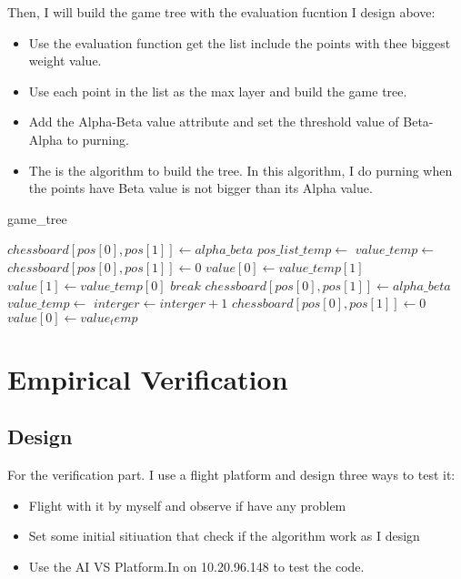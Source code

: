 \documentclass[conference,compsoc]{IEEEtran}
\begin{document}
  Then, I will build the game tree with the evaluation fucntion I design above:
  \begin{itemize}
    \item Use the evaluation function get the list include the points with thee biggest weight value.
    \item Use each point in the list as the max layer and build the game tree.
    \item Add the Alpha-Beta value attribute and set the threshold value of Beta-Alpha to purning.
    \item The  is the algorithm to build the tree. In this algorithm, I do purning when the points have Beta value is not bigger than its Alpha value.
  \end{itemize}
  \begin{algorithm}
    \caption{game\_tree}
    \begin{algorithmic}[1]
      \State $ chessboard[pos[0],pos[1]] \gets alpha\_beta $
      \State $ pos\_list\_temp \gets$
      \State $ value\_temp\gets$
      \State $ chessboard[pos[0], pos[1]]\gets 0 $
              \State $ value[0]\gets value\_temp[1]$
              \EndIf
          \Else
              \State $ value[1]\gets value\_temp[0]$
              \EndIf
              \EndIf    
          \State $ break $
          \EndIf    
      \Else
      \State $ chessboard[pos[0], pos[1]]\gets alpha\_beta $
      \State $ value\_temp \gets$
      \State $ interger\gets interger + 1 $
      \State $ chessboard[pos[0], pos[1]]\gets 0 $
      \State $ value[0]\gets value_temp $
      \EndIf
    \EndFor
        \EndFunction
      \end{algorithmic}
  \end{algorithm}

\section{Empirical Verification}
\subsection{Design}
For the verification part. I use a flight platform and design three ways to test it:
\begin{itemize}
  \item Flight with it by myself and observe if have any problem
  \item Set some initial sitiuation that check if the algorithm work as I design
  \item Use the AI VS Platform.In on 10.20.96.148 to test the code.
\end{itemize}
\end{document}
